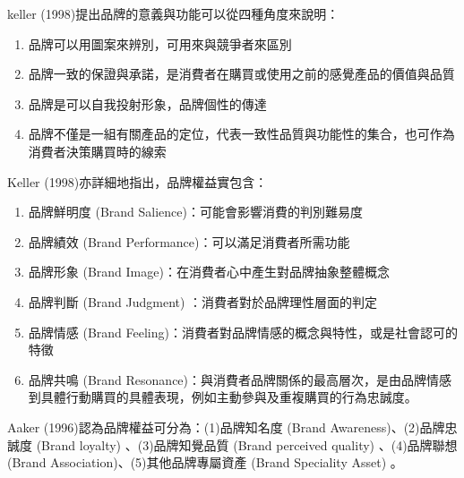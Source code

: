 keller (1998)\cite{Keller1998}提出品牌的意義與功能可以從四種角度來說明：
\begin{enumerate}
\item 品牌可以用圖案來辨別，可用來與競爭者來區別

\item 品牌一致的保證與承諾，是消費者在購買或使用之前的感覺產品的價值與品質

\item 品牌是可以自我投射形象，品牌個性的傳達

\item 品牌不僅是一組有關產品的定位，代表一致性品質與功能性的集合，也可作為消費者決策購買時的線索
\end{enumerate}
    Keller (1998)\cite{Keller1998}亦詳細地指出，品牌權益實包含：
\begin{enumerate}
\item 品牌鮮明度 (Brand Salience)：可能會影響消費的判別難易度
\item 品牌績效 (Brand Performance)：可以滿足消費者所需功能
\item 品牌形象 (Brand Image)：在消費者心中產生對品牌抽象整體概念
\item 品牌判斷 (Brand Judgment) ：消費者對於品牌理性層面的判定
\item 品牌情感 (Brand Feeling)：消費者對品牌情感的概念與特性，或是社會認可的特徵
\item 品牌共鳴 (Brand Resonance)：與消費者品牌關係的最高層次，是由品牌情感到具體行動購買的具體表現，例如主動參與及重複購買的行為忠誠度。
\end{enumerate}
Aaker (1996)\cite{Aaker1996}認為品牌權益可分為：(1)品牌知名度 (Brand Awareness)、(2)品牌忠誠度 (Brand loyalty) 、(3)品牌知覺品質 (Brand perceived quality) 、(4)品牌聯想 (Brand Association)、(5)其他品牌專屬資產 (Brand Speciality Asset) 。





